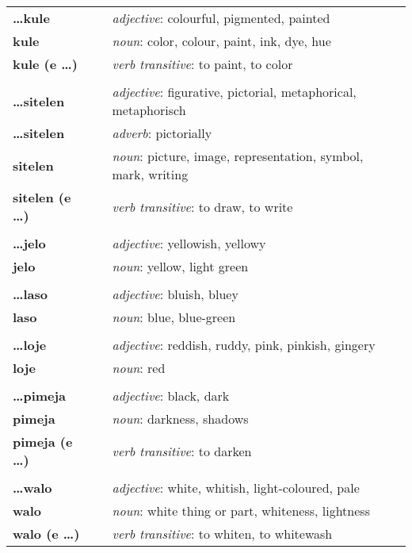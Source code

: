 \begin{supertabular}{p{2,5cm}|ll}
\textbf{\dots kule} && \textit{adjective}: colourful, pigmented, painted \\ %
\textbf{kule} && \textit{noun}: color, colour, paint, ink, dye, hue \\ %
\textbf{kule (e \dots)} && \textit{verb transitive}: to paint, to color \\ %
 && \\ %
\textbf{\dots sitelen} && \textit{adjective}: figurative, pictorial, metaphorical, metaphorisch \\ %
\textbf{\dots sitelen} && \textit{adverb}: pictorially \\ %
\textbf{sitelen} && \textit{noun}: picture, image, representation, symbol, mark, writing \\ %
\textbf{sitelen (e \dots)} && \textit{verb transitive}: to draw, to write \\ %
 && \\ %
\textbf{\dots jelo} && \textit{adjective}: yellowish, yellowy \\ %
\textbf{jelo} && \textit{noun}: yellow, light green \\ %
 && \\ %
\textbf{\dots laso} && \textit{adjective}: bluish, bluey \\ %
\textbf{laso} && \textit{noun}: blue, blue-green \\ %
 && \\ %
\textbf{\dots loje} && \textit{adjective}: reddish, ruddy, pink, pinkish, gingery \\ %
\textbf{loje} && \textit{noun}: red \\ %
 && \\ %
\textbf{\dots pimeja} && \textit{adjective}: black, dark \\ %
\textbf{pimeja} && \textit{noun}: darkness, shadows \\ %
\textbf{pimeja (e \dots)} && \textit{verb transitive}: to darken \\ %
 && \\ %
\textbf{\dots walo} && \textit{adjective}: white, whitish, light-coloured, pale \\ %
\textbf{walo} && \textit{noun}: white thing or part, whiteness, lightness \\ %
\textbf{walo (e \dots)} && \textit{verb transitive}: to whiten, to whitewash \\ %
\end{supertabular} \\
%

